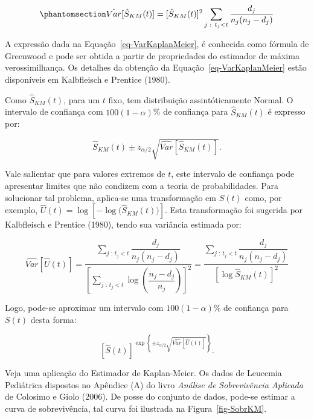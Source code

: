 \documentclass[
  12pt,
  letterpaper,
  DIV=11,
  numbers=noendperiod]{scrreprt}
\begin{document}
\begin{equation}\phantomsection\label{eq-VarKaplanMeier}{
\hat{Var}[\hat{S}_{KM}(t)] = [\hat{S}_{KM}(t)]^{2} \sum_{j \text{ : } t_{j} < t} \dfrac{d_{j}}{n_{j} (n_{j} - d_{j})}
}\end{equation}

A expressão dada na Equação~\ref{eq-VarKaplanMeier}, é conhecida como
fórmula de Greenwood e pode ser obtida a partir de propriedades do
estimador de máxima verossimilhança. Os detalhes da obtenção da
Equação~\ref{eq-VarKaplanMeier} estão disponíveis em Kalbfleisch e
Prentice (1980).

Como \(\hat{S}_{KM}(t)\), para um \(t\) fixo, tem distribuição
assintóticamente Normal. O intervalo de confiança com
\(100(1 - \alpha)\)\% de confiança para \(\hat{S}_{KM}(t)\) é expresso
por:

\[
\hat{S}_{KM}(t) \pm z_{\alpha/2} \sqrt{\hat{Var}[\hat{S}_{KM}(t)]}.
\]

Vale salientar que para valores extremos de \(t\), este intervalo de
confiança pode apresentar limites que não condizem com a teoria de
probabilidades. Para solucionar tal problema, aplica-se uma
transformação em \(S(t)\) como, por exemplo,
\(\hat{U}(t) = \log{[-\log{(\hat{S}_{KM}(t)})]}\). Esta transformação
foi sugerida por Kalbfleisch e Prentice (1980), tendo sua variância
estimada por:

\[
\hat{Var}[\hat{U}(t)] = \dfrac{ \sum_{j \text{ : } t_{j} < t} \dfrac{d_{j}}{n_{j} (n_{j} - d_{j})} }{ \left[\sum_{j \text{ : } t_{j} < t} \log{\left( \dfrac{n_{j} - d_{j}}{n_{j}} \right)}\right]^{2}} = \dfrac{ \sum_{j \text{ : } t_{j} < t} \dfrac{d_{j}}{n_{j} (n_{j} - d_{j})} }{ \left[ \log{\hat{S}_{KM}(t)} \right]^{2} }
\]

Logo, pode-se aproximar um intervalo com \(100 (1 - \alpha)\%\) de
confiança para \(S(t)\) desta forma:

\[
\left[ \hat{S}(t) \right]^{ \exp\left\{ \pm z_{\alpha / 2} \sqrt{\hat{Var}[\hat{U}(t)]} \right\}}.
\]

Veja uma aplicação do Estimador de Kaplan-Meier. Os dados de Leucemia
Pediátrica dispostos no Apêndice (A) do livro \emph{Análise de
Sobrevivência Aplicada} de Colosimo e Giolo (2006). De posse do conjunto
de dados, pode-se estimar a curva de sobrevivência, tal curva foi
ilustrada na Figura~\ref{fig-SobrKM}.
\end{document}
